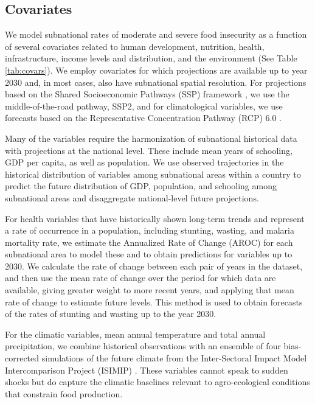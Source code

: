\documentclass[titlepage]{article}
\begin{document}
\subsection{Covariates}
We model subnational rates of moderate and severe food insecurity as a function of several covariates related to human development, nutrition, health, infrastructure, income levels and distribution, and the environment (See Table \ref{tab:covars}).  We employ covariates for which projections are available up to year 2030 and, in most cases, also have subnational spatial resolution.  For projections based on the Shared Socioeconomic Pathways (SSP) framework \cite{oneill2014new}, we use the middle-of-the-road pathway, SSP2, and for climatological variables, we use forecasts based on the Representative Concentration Pathway (RCP) 6.0 \cite{van2011representative}. 

Many of the variables require the harmonization of subnational historical data with projections at the national level.  These include mean years of schooling, GDP per capita, as well as population. We use observed trajectories in the historical distribution of variables among subnational areas within a country to predict the future distribution of GDP, population, and schooling among subnational areas and disaggregate national-level future projections.

For health variables that have historically shown long-term trends and represent a rate of occurrence in a population, including stunting, wasting, and malaria mortality rate, we estimate the Annualized Rate of Change (AROC) for each subnational area to model these and to obtain predictions for variables up to 2030. We calculate the rate of change between each pair of years in the dataset, and then use the mean rate of change over the period for which data are available, giving greater weight to more recent years, and applying that mean rate of change to estimate future levels.  This method is used to obtain forecasts of the rates of stunting and wasting up to the year 2030.

For the climatic variables, mean annual temperature and total annual precipitation, we combine historical observations with an ensemble of four bias-corrected simulations of the future climate from the Inter-Sectoral Impact Model Intercomparison Project (ISIMIP) \cite{warszawski2014inter}.  These variables cannot speak to sudden shocks but do capture the climatic baselines relevant to agro-ecological conditions that constrain food production.
\end{document}
